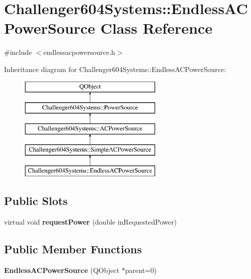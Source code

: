 \hypertarget{class_challenger604_systems_1_1_endless_a_c_power_source}{\section{Challenger604\-Systems\-:\-:Endless\-A\-C\-Power\-Source Class Reference}
\label{class_challenger604_systems_1_1_endless_a_c_power_source}
}


{\ttfamily \#include $<$endlessacpowersource.\-h$>$}

Inheritance diagram for Challenger604\-Systems\-:\-:Endless\-A\-C\-Power\-Source\-:\begin{figure}[H]
\begin{center}
\leavevmode
\includegraphics[height=5.000000cm]{class_challenger604_systems_1_1_endless_a_c_power_source}
\end{center}
\end{figure}
\subsection*{Public Slots}
\begin{DoxyCompactItemize}
\item 
\hypertarget{class_challenger604_systems_1_1_endless_a_c_power_source_a57bb47c8bbd06d554757b8e1d12e2d3c}{virtual void {\bfseries request\-Power} (double in\-Requested\-Power)}\label{class_challenger604_systems_1_1_endless_a_c_power_source_a57bb47c8bbd06d554757b8e1d12e2d3c}

\end{DoxyCompactItemize}
\subsection*{Public Member Functions}
\begin{DoxyCompactItemize}
\item 
\hypertarget{class_challenger604_systems_1_1_endless_a_c_power_source_a9e3a099aae94b1e9009fb187d594505b}{{\bfseries Endless\-A\-C\-Power\-Source} (Q\-Object $\ast$parent=0)}\label{class_challenger604_systems_1_1_endless_a_c_power_source_a9e3a099aae94b1e9009fb187d594505b}

\end{DoxyCompactItemize}
